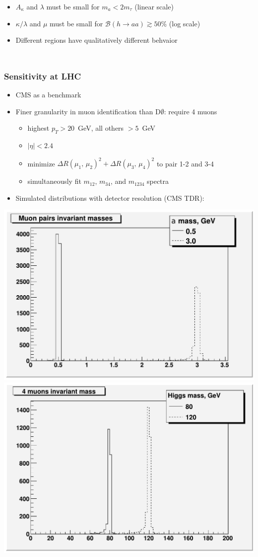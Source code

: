 \documentclass[compress]{beamer}
\begin{document}
\begin{frame}
\begin{columns}
\begin{itemize}
\item $A_\kappa$ and $\lambda$ must be small for $m_a < 2m_\tau$ {\scriptsize (linear scale)}

\vspace{0.85 cm}

\item $\kappa/\lambda$ and $\mu$ must be small for $\mathcal{B}(h \to aa) \gtrsim 50$\% {\scriptsize (log scale)}

\item Different regions have qualitatively different behvaior
\end{itemize}
\end{columns}
\end{frame}

\begin{frame}
\frametitle{Sensitivity at LHC}

\begin{itemize}
\item CMS as a benchmark
\item Finer granularity in muon identification than D$\emptyset$: require 4 muons
\begin{itemize}\setlength{\itemsep}{0.1 cm}
\item highest $p_T > 20$~GeV, all others $> 5$~GeV
\item $|\eta| < 2.4$
\item minimize ${\Delta R(\mu_1\mbox{, }\mu_2)}^2 + {\Delta R(\mu_3\mbox{, }\mu_4)}^2$ to pair 1-2 and 3-4
\item simultaneously fit $m_{12}$, $m_{34}$, and $m_{1234}$ spectra
\end{itemize}
\item Simulated distributions with detector resolution (CMS TDR):
\end{itemize}

\vfill
\includegraphics[width=0.5\linewidth]{muon_pairs_masses.pdf}
\includegraphics[width=0.5\linewidth]{invariant_mass.pdf}
\end{frame}
\end{document}
